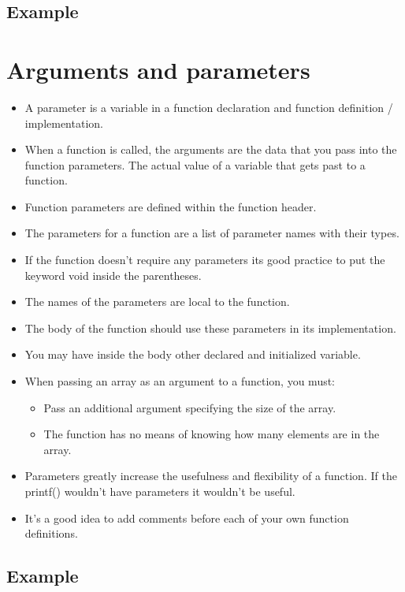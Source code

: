 \subsection{Example}

\section{Arguments and parameters}
\begin{itemize}
    \item A parameter is a variable in a function declaration and function definition / implementation. 
    \item When a function is called, the arguments are the data that you pass into the function parameters. The actual value of a variable that gets past to a function. 
    \item Function parameters are defined within the function header. 
    \item The parameters for a function are a list of parameter names with their types. 
    \item If the function doesn't require any parameters its good practice to put the keyword void inside the parentheses. 
    \item The names of the parameters are local to the function. 
    \item The body of the function should use these parameters in its implementation. 
    \item You may have inside the body other declared and initialized variable. 
    \item When passing an array as an argument to a function, you must: 
        \begin{itemize}
            \item Pass an additional argument specifying the size of the array. 
            \item The function has no means of knowing how many elements are in the array. 
        \end{itemize}
    \item Parameters greatly increase the usefulness and flexibility of a function. If the printf() wouldn't have parameters it wouldn't be useful.
    \item It's a good idea to add comments before each of your own function definitions. 
\end{itemize}
\subsection{Example}

